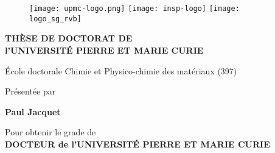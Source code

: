 \thispagestyle{empty}

\begin{figure}
  \texttt{[image: upmc-logo.png]}
\endminipage\hfill
{}
\centering
  \texttt{[image: insp-logo]}
\endminipage\hfill
{}%
  \texttt{[image: logo\_sg\_rvb]}
\endminipage
\end{figure}


\vspace*{1cm}

\begin{center}

{\bf TH\`ESE DE DOCTORAT DE \\ l'UNIVERSIT\'E PIERRE ET MARIE CURIE}

\vspace*{0.5cm}


École doctorale Chimie et Physico-chimie des matériaux (397)

\vspace*{0.2cm}


Pr\'esent\'ee par \ \\


\vspace*{0.5cm}


{\Large {\bf Paul Jacquet}}

\vspace*{1cm}
Pour obtenir le grade de \ \\[1ex]
{\bf DOCTEUR de l'UNIVERSIT\'E PIERRE ET MARIE CURIE} \ \\

\vspace*{1cm}

\end{center}

